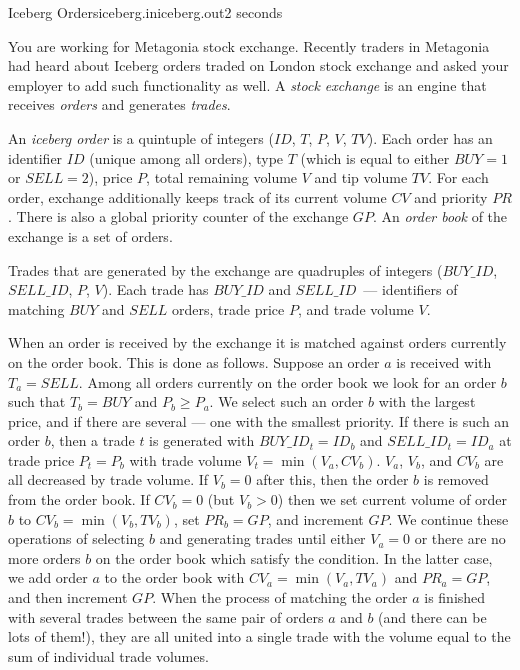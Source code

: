\begin{problem}{Iceberg Orders}{iceberg.in}{iceberg.out}{2 seconds}


You are working for Metagonia stock exchange. Recently traders in Metagonia had heard about Iceberg orders
traded on London stock exchange and asked your employer to add such functionality as well.
A \emph{stock exchange} is an engine that receives \emph{orders} and generates \emph{trades}.

An \emph{iceberg order} is a quintuple of integers ($ID$, $T$, $P$, $V$, $TV$). 
Each order has an identifier $ID$ (unique among all orders), 
type $T$ (which is equal to either $BUY=1$ or $SELL=2$), 
price $P$, total remaining volume $V$ and tip volume $TV$. 
For each order, exchange additionally keeps track of its current volume $CV$ and priority $PR$.
There is also a global priority counter of the exchange $GP$.
An \emph{order book} of the exchange is a set of orders.

Trades that are generated by the exchange are quadruples of integers ($BUY\_ID$, $SELL\_ID$, $P$, $V$). 
Each trade has $BUY\_ID$ and $SELL\_ID$~--- identifiers of matching $BUY$ and $SELL$ orders, 
trade price $P$, and trade volume $V$.

When an order is received by the exchange it is matched against orders currently on the order book. 
This is done as follows. Suppose an order $a$ is received with
$T_a = SELL$. Among all orders currently on the order book we look for an order $b$ such that $T_b = BUY$ and
$P_b \geq P_a$. We select such an order $b$ with the largest price, and if there are several --- one with the smallest priority. 
If there is such an order $b$, then a trade $t$ is generated with $BUY\_ID_t = ID_b$ and $SELL\_ID_t = ID_a$
at trade price $P_t = P_b$ with trade volume $V_t = \min(V_a, CV_b)$. 
$V_a$, $V_b$, and $CV_b$ are all decreased by trade volume. If $V_b = 0$ after this, then the order $b$ is removed from the order book. 
If $CV_b=0$ (but $V_b > 0$) then we set current volume of order $b$ to 
$CV_b = \min(V_b, TV_b)$, set $PR_b = GP$, and increment $GP$. 
We continue these operations of selecting $b$ and generating trades until either $V_a = 0$ or
there are no more orders $b$ on the order book which satisfy the condition. In the latter case, we add order $a$ to the order book 
with $CV_a = \min(V_a, TV_a)$ and $PR_a = GP$, and then increment $GP$. When the process of matching the order $a$ is finished with 
several trades between the same pair of orders $a$ and $b$ (and there can be lots of them!), 
they are all united into a single trade with the volume equal to the sum of individual trade volumes.


\end{problem}
